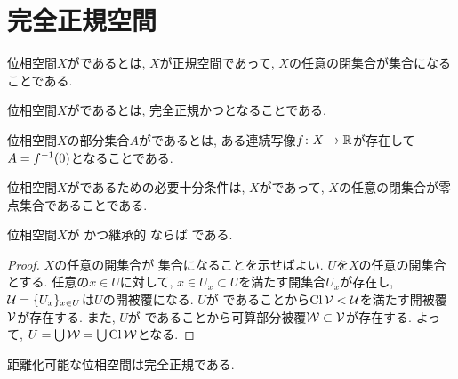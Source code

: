 \documentclass[uplatex, dvipdfmx, a4paper, 12pt, class=jsbook, crop=false]{standalone}
\begin{document}
\section{完全正規空間}
\label{sec:perfectly-normal-spaces}

\begin{definition}
	位相空間$ X $がであるとは,
	$ X $が正規空間であって,
	$ X $の任意の閉集合が\Gdelta 集合になることである.
\end{definition}

\begin{definition}
	位相空間$ X $がであるとは,
	完全正規かつとなることである.
\end{definition}

\begin{definition}
	位相空間$ X $の部分集合$ A $がであるとは,
	ある連続写像$ f\colon X\to\mathbb{R} $が存在して$ A = \mapinvpt{f}{0} $となることである.
\end{definition}

\begin{proposition}
	位相空間\(X\)がであるための必要十分条件は,
	\(X\)がであって,
	\(X\)の任意の閉集合が零点集合であることである.
\end{proposition}

\begin{proposition}
	\label{prop:T_3 + hLind. implies T_6}
	位相空間$X$が かつ継承的 \Lindelof ならば である.
\end{proposition}
\begin{proof}
	$X$の任意の開集合が \Fsigma 集合になることを示せばよい.
	$U$を$X$の任意の開集合とする.
	任意の$x\in U$に対して, $x\in U_x\subset U$を満たす開集合$U_x$が存在し,
	${\cal U}=\{U_x\}_{x\in U}$は$U$の開被覆になる.
	$U$が  であることから$\mathop{\mathrm{Cl}}\nolimits {\cal V}< {\cal U}$を満たす開被覆${\cal V}$が存在する.
	また,
	$U$が \Lindelof であることから可算部分被覆${\cal W}\subset {\cal V}$が存在する.
	よって, $U=\bigcup {\cal W}=\bigcup \mathop{\mathrm{Cl}}\nolimits {\cal W}$となる.
\end{proof}

\begin{proposition}
	距離化可能な位相空間は完全正規である.
\end{proposition}
\end{document}

